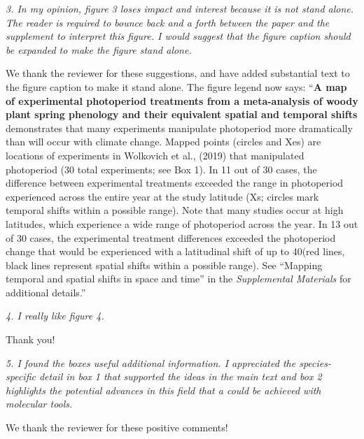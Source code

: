 \documentclass{article}
\begin{document}
\par \emph{3. In my opinion, figure 3 loses impact and interest because it is not stand alone. The reader is required to bounce back and a forth between the paper and the supplement to interpret this figure. I would suggest that the figure caption should be expanded to make the figure stand alone. }
\par We thank the reviewer for these suggestions, and have added substantial text to the figure caption to make it stand alone. The figure legend now says:
``\textbf{A map of experimental photoperiod treatments from a meta-analysis of woody plant spring phenology and their equivalent spatial and temporal shifts} demonstrates that many experiments manipulate photoperiod more dramatically than will occur with climate change. Mapped points (circles and Xes) are locations of experiments in Wolkovich et al., (2019) that manipulated photoperiod (30 total experiments; see Box 1). In 11 out of 30 cases, the difference between experimental treatments exceeded the range in photoperiod experienced across the entire year at the study latitude (Xs; circles mark temporal shifts within a possible range). Note that many studies occur at high latitudes, which experience a wide range of photoperiod across the year. In 13 out of 30 cases, the experimental treatment differences exceeded the photoperiod change that would be experienced with a latitudinal shift of up to 40\degree (red lines, black lines represent spatial shifts within a possible range). See ``Mapping temporal and spatial shifts in space and time'' in the \emph{Supplemental Materials} for additional details.'' 

\par \emph{4. I really like figure 4. }
\par Thank you!
\par \emph{5. I found the boxes useful additional information. I appreciated the species-specific detail in box 1 that supported the ideas in the main text and box 2 highlights the potential advances in this field that a could be achieved with molecular tools.}
\par We thank the reviewer for these positive comments!
\end{document}
